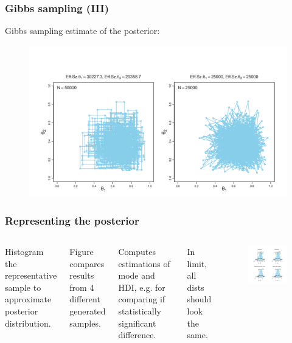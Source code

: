 \documentclass[usenames,dvipsnames,table]{beamer}
\begin{document}
\begin{frame}
\frametitle{Gibbs sampling (III)}
Gibbs sampling estimate of the posterior:
\begin{figure}
\centering
\includegraphics[height=0.7\textheight]{img/fig7_8}
\end{figure}
\end{frame}

\begin{frame}
\frametitle{Representing the posterior}
\begin{columns}[c]
Histogram the representative sample to approximate posterior distribution.

\vspace{1em}
Figure compares results from 4 different generated samples.

\vspace{1em}
Computes estimations of mode and HDI, e.g. for comparing if statistically significant difference.

\vspace{1em}
In limit, all dists should look the same.
\begin{figure}
\centering
\includegraphics[height=0.6\textheight]{img/fig7_9}
\end{figure}
\end{columns}
\end{frame}
\end{document}
